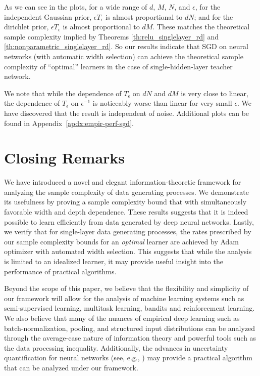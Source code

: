 \documentclass[twoside,11pt]{article}
\begin{document}
As we can see in the plots, for a wide range of $d$, $M$, $N$, and $\epsilon$,
for the independent Gaussian prior, $\epsilon T_{\epsilon}$ is almost proportional to $dN$;
and for the dirichlet prior, $\epsilon T_{\epsilon}$ is almost proportional to $dM$.
These matches the theoretical sample complexity implied by Theorems \ref{th:relu_singlelayer_rd} and \ref{th:nonparametric_singlelayer_rd}.
So our results indicate that SGD on neural networks (with automatic width selection) can achieve the theoretical sample complexity of ``optimal'' learners in the case of single-hidden-layer teacher network.

We note that while the dependence of $T_\epsilon$ on $dN$ and $dM$ is very close to linear, the dependence of $T_\epsilon$ on $\epsilon^{-1}$ is noticeably worse than linear for very small $\epsilon$.
We have discovered that the result is independent of noise.
Additional plots can be found in Appendix~\ref{apdx:empir-perf-sgd}.

\section{Closing Remarks}

We have introduced a novel and elegant information-theoretic framework for analyzing the sample complexity of data generating processes. We demonstrate its usefulness by proving a sample complexity bound that with simultaneously favorable width and depth dependence. These results suggests that it is indeed possible to learn efficiently from data generated by deep neural networks. Lastly, we verify that for single-layer data generating processes, the rates prescribed by our sample complexity bounds for an \emph{optimal} learner are achieved by Adam optimizer with automated width selection. This suggests that while the analysis is limited to an idealized learner, it may provide useful insight into the performance of practical algorithms.

Beyond the scope of this paper, we believe that the flexibility and simplicity of our framework will allow for the analysis of machine learning systems such as semi-supervised learning, multitask learning, bandits and reinforcement learning. We also believe that many of the nuances of empirical deep learning such as batch-normalization, pooling, and structured input distributions can be analyzed through the average-case nature of information theory and powerful tools such as the data processing inequality. Additionally, the advances in uncertainty quantification for neural networks (see, e.g., \citep{osband2021epistemic}) may provide a practical algorithm that can be analyzed under our framework.
\end{document}

